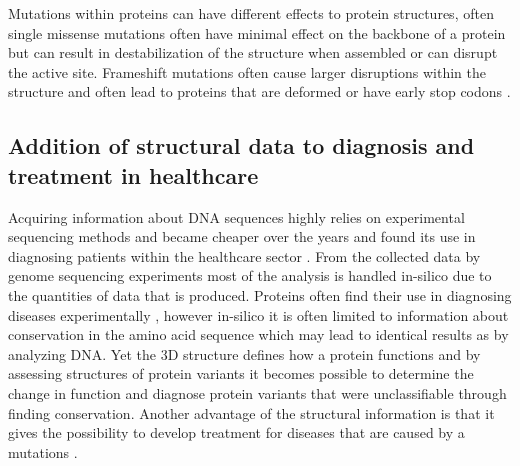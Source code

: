 Mutations within proteins can have different effects to protein structures, often single missense mutations often have minimal effect on the backbone of a protein \cite{feyfant_modeling_2007,chothia_relation_1986} but can result in destabilization of the structure when assembled or can disrupt the active site. Frameshift mutations often cause larger disruptions within the structure and often lead to proteins that are deformed or have early stop codons \cite{ogura_frameshift_2001}.
\label{subsec:GD_Structural_Levels_and_Mutation_Effects}


\subsection{Addition of structural data to diagnosis and treatment in healthcare}
Acquiring information about DNA sequences highly relies on experimental sequencing methods and became cheaper over the years \cite{nih_cost_nodate} and found its use in diagnosing patients within the healthcare sector \cite{ van_der_velde_gavin:_2017}.
From the collected data by genome sequencing experiments most of the analysis is handled in-silico due to the quantities of data that is produced. Proteins often find their use in diagnosing diseases experimentally \cite{hortin_introduction:_2010, bennion_protein_2002}, however in-silico it is often limited to information about conservation in the amino acid sequence which may lead to identical results as by analyzing DNA.
Yet the 3D structure defines how a protein functions \cite{nanev_how_2008} and by assessing structures of protein variants it becomes possible to determine the change in function and diagnose protein variants that were unclassifiable through finding conservation.
Another advantage of the structural information is that it gives the possibility to develop treatment for diseases that are caused by a mutations \cite{niu_protein-structure-guided_2016}.
